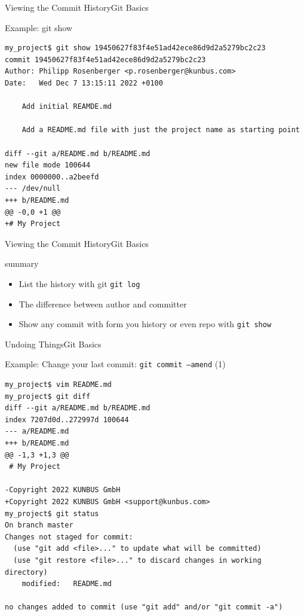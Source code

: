 \documentclass[aspectratio=169]{beamer}
\renewcommand{\footnotesize}{\tiny}
\begin{document}
\begin{frame}[fragile]{Viewing the Commit History}{Git Basics}
\begin{block}{Example: \ttfamily git show}
\begin{verbatim}
my_project$ git show 19450627f83f4e51ad42ece86d9d2a5279bc2c23
commit 19450627f83f4e51ad42ece86d9d2a5279bc2c23
Author: Philipp Rosenberger <p.rosenberger@kunbus.com>
Date:   Wed Dec 7 13:15:11 2022 +0100

    Add initial REAMDE.md
    
    Add a README.md file with just the project name as starting point

diff --git a/README.md b/README.md
new file mode 100644
index 0000000..a2beefd
--- /dev/null
+++ b/README.md
@@ -0,0 +1 @@
+# My Project
\end{verbatim}
\end{block}
\end{frame}

\begin{frame}[fragile]{Viewing the Commit History}{Git Basics}
\begin{block}{summary}
\begin{itemize}
	\item List the history with git \verb|git log|
	\item The difference between author and committer 
	\item Show any commit with form you history or even repo with \verb|git show|
\end{itemize}
\end{block}
\end{frame}

\begin{frame}[fragile]{Undoing Things}{Git Basics}
\begin{block}{Example: Change your last commit: \texttt{git commit --amend} {\small(1)}}
\begin{verbatim}
my_project$ vim README.md
my_project$ git diff
diff --git a/README.md b/README.md
index 7207d0d..272997d 100644
--- a/README.md
+++ b/README.md
@@ -1,3 +1,3 @@
 # My Project
 
-Copyright 2022 KUNBUS GmbH
+Copyright 2022 KUNBUS GmbH <support@kunbus.com>
my_project$ git status 
On branch master
Changes not staged for commit:
  (use "git add <file>..." to update what will be committed)
  (use "git restore <file>..." to discard changes in working directory)
	modified:   README.md

no changes added to commit (use "git add" and/or "git commit -a")
\end{verbatim}
\end{block}
\end{frame}
\end{document}
